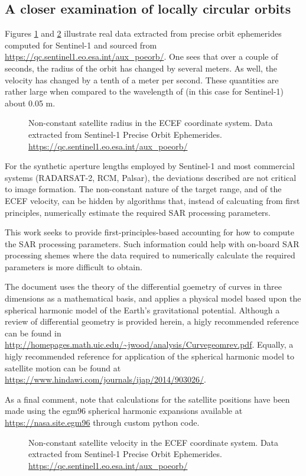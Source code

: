 \subsection{A closer examination of locally circular orbits}
Figures \ref{fg:ECEFRange} and \ref{fg:ECEFVelocity} illustrate real data extracted from precise orbit ephemerides computed for Sentinel-1 and sourced from \url{https://qc.sentinel1.eo.esa.int/aux\_poeorb/}. One sees that over a couple of seconds, the radius of the orbit has changed by several meters. As well, the velocity has changed by a tenth of a meter per second. These quantities are rather large when compared to the wavelength of (in this case for Sentinel-1) about 0.05 m.
\begin{figure}
    \resizebox{\textwidth}{!}{}
	\caption{Non-constant satellite radius in the ECEF coordinate system. Data extracted from Sentinel-1 Precise Orbit Ephemerides. \url{https://qc.sentinel1.eo.esa.int/aux\_poeorb/}}
	\label{fg:ECEFRange}
\end{figure}
\par
For the synthetic aperture lengths employed by Sentinel-1 and most commercial systems (RADARSAT-2, RCM, Palsar), the deviations described are not critical to image formation. The non-constant nature of the target range, and of the ECEF velocity, can be hidden by algorithms that, instead of calcuating from first principles, numerically estimate the required SAR processing parameters. 
\par
This work seeks to provide first-principles-based accounting for how to compute the SAR processing parameters. Such information could help with on-board SAR processing shemes where the data required to numerically calculate the required parameters is more difficult to obtain. 
\par
The document uses the theory of the differential goemetry of curves in three dimensions as a mathematical basis, and applies a physical model based upon the spherical harmonic model of the Earth's gravitational potential. Although a review of differential geometry is provided herein, a higly recommended reference can be found in \url{http://homepages.math.uic.edu/~jwood/analysis/Curvegeomrev.pdf}. Equally, a higly recommended reference for application of the spherical harmonic model to satellite motion can be found at \url{https://www.hindawi.com/journals/ijap/2014/903026/}. 
\par
As a final comment, note that calculations for the satellite positions have been made using the egm96 spherical harmonic expansions available at \url{https://nasa.site.egm96} through custom python code. 
\begin{figure}
    \resizebox{\textwidth}{!}{}
	\caption{Non-constant satellite velocity in the ECEF coordinate system. Data extracted from Sentinel-1 Precise Orbit Ephemerides. \url{https://qc.sentinel1.eo.esa.int/aux\_poeorb/}}
	\label{fg:ECEFVelocity}
\end{figure}
\clearpage

